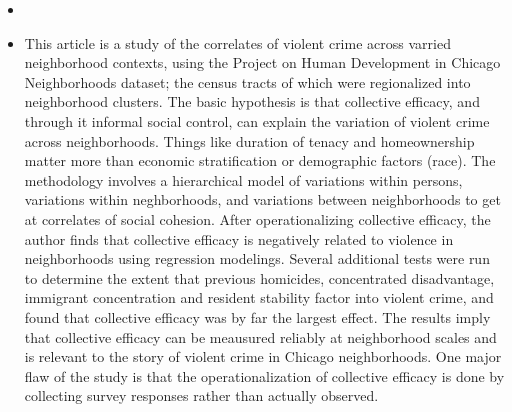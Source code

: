 \documentclass{article}
\begin{document}
\begin{itemize}
\item \cite{sampson1997NeighborhoodsViolent}
\item This article is a study of the correlates of violent crime across varried neighborhood contexts, using the Project on Human Development in Chicago Neighborhoods dataset; the census tracts of which were regionalized into neighborhood clusters. The basic hypothesis is that collective efficacy, and through it informal social control, can explain the variation of violent crime across neighborhoods. Things like duration of tenacy and homeownership matter more than economic stratification or demographic factors (race). The methodology involves a hierarchical model of variations within persons, variations within neghborhoods, and variations between neighborhoods to get at correlates of social cohesion. After operationalizing collective efficacy, the author finds that collective efficacy is negatively related to violence in neighborhoods using regression modelings. Several additional tests were run to determine the extent that previous homicides, concentrated disadvantage, immigrant concentration and resident stability factor into violent crime, and found that collective efficacy was by far the largest effect. The results imply that collective efficacy can be meausured reliably at neighborhood scales and is relevant to the story of violent crime in Chicago neighborhoods. One major flaw of the study is that the operationalization of collective efficacy is done by collecting survey responses rather than actually observed.

\end{itemize}  
\end{document}

